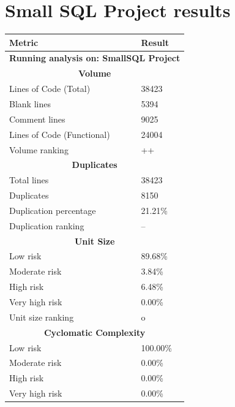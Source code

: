 \documentclass[11pt]{report}
\begin{document}
\section{Small SQL Project results}
\label{sec:small-sql}

\begin{table}[H]
    \centering
    \begin{tabular}{|l|l|}
        \hline
        \textbf{Metric} & \textbf{Result} \\
        \hline
        \multicolumn{2}{|c|}{\textbf{Running analysis on: SmallSQL Project}} \\
        \hline
        \multicolumn{2}{|c|}{\textbf{Volume}} \\
        \hline
        Lines of Code (Total) & 38423 \\
        \hline
        Blank lines & 5394 \\
        \hline
        Comment lines & 9025 \\
        \hline
        Lines of Code (Functional) & 24004 \\
        \hline
        Volume ranking & ++ \\
        \hline
        \multicolumn{2}{|c|}{\textbf{Duplicates}} \\
        \hline
        Total lines & 38423 \\
        \hline
        Duplicates & 8150 \\
        \hline
        Duplication percentage & 21.21\% \\
        \hline
        Duplication ranking & -- \\
        \hline
        \multicolumn{2}{|c|}{\textbf{Unit Size}} \\
        \hline
        Low risk & 89.68\% \\
        \hline
        Moderate risk & 3.84\% \\
        \hline
        High risk & 6.48\% \\
        \hline
        Very high risk & 0.00\% \\
        \hline
        Unit size ranking & o \\
        \hline
        \multicolumn{2}{|c|}{\textbf{Cyclomatic Complexity}} \\
        \hline
        Low risk & 100.00\% \\
        \hline
        Moderate risk & 0.00\% \\
        \hline
        High risk & 0.00\% \\
        \hline
        Very high risk & 0.00\% \\

\end{tabular}
\end{table}
\end{document}
